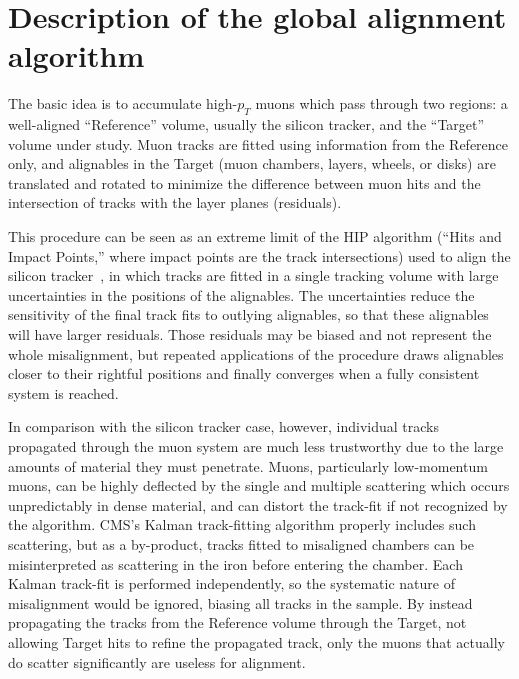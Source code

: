 \documentclass[12pt]{article}
\begin{document}
\section{Description of the global alignment algorithm}

The basic idea is to accumulate high-$p_T$ muons which pass through
two regions: a well-aligned ``Reference'' volume, usually the silicon
tracker, and the ``Target'' volume under study.  Muon tracks are
fitted using information from the Reference only, and alignables in
the Target (muon chambers, layers, wheels, or disks) are translated
and rotated to minimize the difference between muon hits and the
intersection of tracks with the layer planes (residuals).

This procedure can be seen as an extreme limit of the HIP algorithm
(``Hits and Impact Points,'' where impact points are the track
intersections) used to align the silicon tracker~\cite{trackerhip}, in
which tracks are fitted in a single tracking volume with large
uncertainties in the positions of the alignables.  The uncertainties
reduce the sensitivity of the final track fits to outlying alignables,
so that these alignables will have larger residuals.  Those residuals
may be biased and not represent the whole misalignment, but repeated
applications of the procedure draws alignables closer to their
rightful positions and finally converges when a fully consistent
system is reached.

In comparison with the silicon tracker case, however, individual
tracks propagated through the muon system are much less trustworthy
due to the large amounts of material they must penetrate.  Muons,
particularly low-momentum muons, can be highly deflected by the single
and multiple scattering which occurs unpredictably in dense material,
and can distort the track-fit if not recognized by the algorithm.
CMS's Kalman track-fitting algorithm properly includes such
scattering, but as a by-product, tracks fitted to misaligned chambers
can be misinterpreted as scattering in the iron before entering the
chamber.  Each Kalman track-fit is performed independently, so the
systematic nature of misalignment would be ignored, biasing all tracks
in the sample.  By instead propagating the tracks from the Reference
volume through the Target, not allowing Target hits to refine the
propagated track, only the muons that actually do scatter
significantly are useless for alignment.
\end{document}
